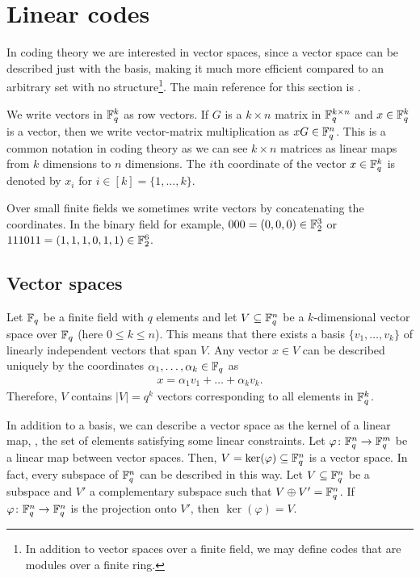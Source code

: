 \documentclass[../main.tex]{subfiles}
\begin{document}
\section{Linear codes}

In coding theory we are interested in vector spaces, since a vector space can be described just with the basis, making it much more efficient compared to an arbitrary set with no structure\footnote{In addition to vector spaces over a finite field, we may define codes that are modules over a finite ring.}. The main reference for this section is \cite[Chapter 4]{ling2004coding}.

We write vectors in $\mathbb{F}_q^k$ as row vectors. If $G$ is a $k \times n$ matrix in $\mathbb{F}_q^{k \times n}$ and $x \in \mathbb{F}_q^k$ is a vector, then we write vector-matrix multiplication as $xG \in \mathbb{F}_q^n$. This is a common notation in coding theory as we can see $k \times n$ matrices as linear maps from $k$ dimensions to $n$ dimensions. The $i$th coordinate of the vector $x \in \mathbb{F}_q^k$ is denoted by $x_i$ for $i \in [k] = \{1, \dots, k\}$.

\begin{example}
Over small finite fields we sometimes write vectors by concatenating the coordinates. In the binary field for example, $000 = (0, 0, 0) \in \mathbb{F}_2^3$ or $111011 = (1, 1, 1, 0, 1, 1) \in \mathbb{F}_2^6$.
\end{example}

\subsection{Vector spaces}

Let $\mathbb{F}_q$ be a finite field with $q$ elements and let $V \subseteq \mathbb{F}_q^n$ be a $k$-dimensional vector space over $\mathbb{F}_q$ (here $0 \leq k \leq n$). This means that there exists a basis $\{v_1, \dots, v_k\}$ of linearly independent vectors that span $V$. Any vector $x \in V$ can be described uniquely by the coordinates $\alpha_1, \dots, \alpha_k \in \mathbb{F}_q$ as
\begin{align*}
    x = \alpha_1 v_1 + \dots + \alpha_k v_k.
\end{align*}
Therefore, $V$ contains $\lvert V \rvert = q^k$ vectors corresponding to all elements in $\mathbb{F}_q^k$.

In addition to a basis, we can describe a vector space as the kernel of a linear map, \ie, the set of elements satisfying some linear constraints. Let $\varphi \colon \mathbb{F}_q^n \to \mathbb{F}_q^m$ be a linear map between vector spaces. Then, $V = \ker(\varphi) \subseteq \mathbb{F}_q^n$ is a vector space. In fact, every subspace of $\mathbb{F}_q^n$ can be described in this way. Let $V \subseteq \mathbb{F}_q^n$ be a subspace and $V'$ a complementary subspace such that $V \oplus V' = \mathbb{F}_q^n$. If $\varphi \colon \mathbb{F}_q^n \to \mathbb{F}_q^n$ is the projection onto $V'$, then $\ker(\varphi) = V$.
\end{document}
